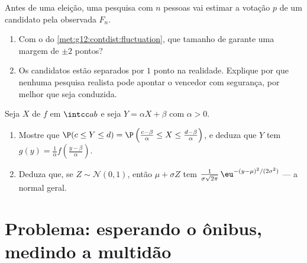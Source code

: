 \begin{exercise}[$\star\star\star$]\label{exo:g12:contdist:8}
Antes de uma eleição, uma pesquisa com $n$ pessoas vai estimar a votação
$p$ de um candidato pela  observada $F_n$.
\begin{enumerate}
  \item Com o  do
        \cref{met:g12:contdist:fluctuation}, que tamanho de 
        garante uma margem de $\pm 2$ pontos?
  \item Os candidatos estão separados por $1$ ponto na realidade. Explique
        por que nenhuma pesquisa realista pode apontar o vencedor com
        segurança, por melhor que seja conduzida.
\end{enumerate}
\end{exercise}

\begin{exercise}[$\star\star\star$]\label{exo:g12:contdist:9}
Seja $X$ de  $f$ em $\intcc ab$ e seja
$Y = \alpha X + \beta$ com $\alpha > 0$.
\begin{enumerate}
  \item Mostre que $\P(c \leq Y \leq d)
        = \P\left(\frac{c - \beta}{\alpha} \leq X \leq
        \frac{d-\beta}{\alpha}\right)$, e deduza que $Y$ tem 
        $g(y) = \frac{1}{\alpha} f\left(\frac{y - \beta}{\alpha}\right)$.
  \item Deduza que, se $Z \sim \mathcal N(0,1)$, então
        $\mu + \sigma Z$ tem 
        $\frac{1}{\sigma\sqrt{2\pi}}\,
        \eu^{-(y - \mu)^2/(2\sigma^2)}$ --- a  normal geral.
\end{enumerate}
\end{exercise}

\section{Problema: esperando o ônibus, medindo a multidão}

